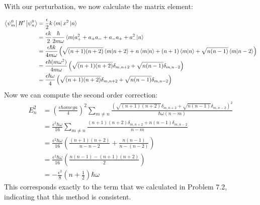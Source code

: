 \documentclass[10pt]{article}
\begin{document}
\begin{enumerate}[label=(\alph*)]
        \begin{solution}
            With our perturbation, we now calculate the matrix element: 

            \begin{align*}
                \bra{\psi_m^0}H'\ket{\psi_n^0} &= \frac{\epsilon}{2}k\bra{m}x^2\ket{n}\\
                &= \frac{\epsilon k}{2} \frac{\hbar}{2m\omega} \mel{m}{a_+^2 + a_+a_- + a_-a_+ + a_-^2}{n}\\
                &= \frac{\epsilon \hbar k}{4m\omega} \left( \sqrt{(n+1)(n+2)}\braket{m}{n+2} + n\braket{m}{n} + (n+1) \braket{m}{n} + \sqrt{n(n-1)}\braket{m}{n-2}\right)\\
                &= \frac{\epsilon \hbar (m\omega^2)}{4m\omega} \left( \sqrt{(n+1)(n+2)} \delta_{m, n+2} + \sqrt{n(n-1)}\delta_{m, n-2}\right)\\
                &= \frac{\epsilon \hbar \omega}{4} \left( \sqrt{(n+1)(n+2)} \delta_{m, n+2} + \sqrt{n(n-1)}\delta_{m, n-2}\right)
            \end{align*}
            Now we can compute the second order correction: 
            \begin{align*}
                E_n^2 &= \left( \frac{\epsilon \hbar omega}{4}\right)^2 \sum_{m \neq n} \frac{\left( \sqrt{(n+1)(n+2)} \delta_{m, n+2} + \sqrt{n(n-1)}\delta_{m, n-2}\right)^2}{\hbar\omega(n - m)}\\
                &= \frac{\epsilon^2 \hbar \omega}{16} \sum_{m \neq n} \frac{(n+1)(n+2) \delta_{m, n+2} + n(n-1)\delta_{m, n-2}}{n -m}\\
                &= \frac{\epsilon^2 \hbar \omega}{16} \left( \frac{(n+1)(n+2)}{n - n-2} + \frac{n(n-1)}{n-(n-2)}\right)\\
                &= \frac{\epsilon^2 \hbar \omega}{16} \left(\frac{ n(n-1) - (n+1)(n+2)}{2}\right)\\
                &= -\frac{\epsilon^2}{8}\left(n + \frac 12\right)\hbar \omega
            \end{align*}
            This corresponds exactly to the term that we calculated in Problem 7.2, indicating that this method is consistent.
            \end{solution}
    \end{enumerate}

    \pagebreak
\end{document}
